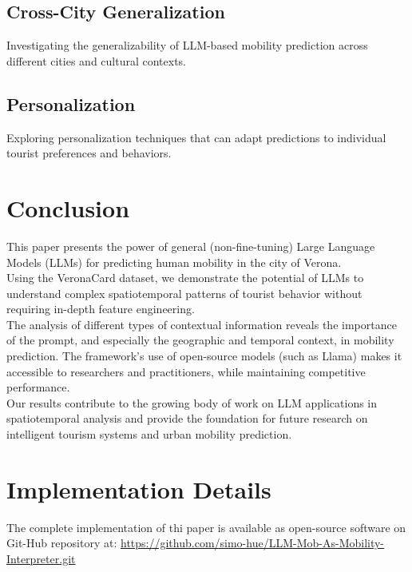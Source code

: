 \documentclass[12pt,a4paper]{article}
\begin{document}
\subsection{Cross-City Generalization}
Investigating the generalizability of LLM-based mobility prediction across different cities and cultural contexts.

\subsection{Personalization}
Exploring personalization techniques that can adapt predictions to individual tourist preferences and behaviors.

\section{Conclusion}

This paper presents the power of general (non-fine-tuning) Large Language Models (LLMs) for predicting human mobility in the city of Verona.\\
Using the VeronaCard dataset, we demonstrate the potential of LLMs to understand complex spatiotemporal patterns of tourist behavior without requiring in-depth feature engineering.\\

The analysis of different types of contextual information reveals the importance of the prompt, and especially the geographic and temporal context, in mobility prediction. The framework's use of open-source models (such as Llama) makes it accessible to researchers and practitioners, while maintaining competitive performance.\\

Our results contribute to the growing body of work on LLM applications in spatiotemporal analysis and provide the foundation for future research on intelligent tourism systems and urban mobility prediction.\\

\section{Implementation Details}

The complete implementation of thi paper is available as open-source software on Git-Hub repository at:
\url{https://github.com/simo-hue/LLM-Mob-As-Mobility-Interpreter.git}
\end{document}
